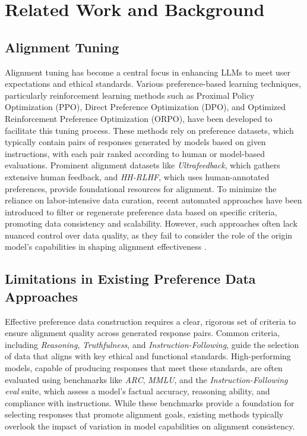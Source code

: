 \section{Related Work and Background}
\subsection{Alignment Tuning}
Alignment tuning has become a central focus in enhancing LLMs to meet user expectations and ethical standards\cite{sage_rt}. Various preference-based learning techniques, particularly reinforcement learning methods such as Proximal Policy Optimization (PPO)\cite{ppo}, Direct Preference Optimization (DPO)\cite{dpo}, and Optimized Reinforcement Preference Optimization (ORPO)\cite{orpo}, have been developed to facilitate this tuning process. These methods rely on preference datasets, which typically contain pairs of responses generated by models based on given instructions, with each pair ranked according to human or model-based evaluations. Prominent alignment datasets like \textit{Ultrafeedback\cite{ultrafeedback}}, which gathers extensive human feedback, and \textit{HH-RLHF\cite{hh_rlhf}}, which uses human-annotated preferences, provide foundational resources for alignment. To minimize the reliance on labor-intensive data curation, recent automated approaches have been introduced to filter or regenerate preference data based on specific criteria, promoting data consistency and scalability. However, such approaches often lack nuanced control over data quality, as they fail to consider the role of the origin model’s capabilities in shaping alignment effectiveness \cite{safer_instruct}.

\subsection{Limitations in Existing Preference Data Approaches}
Effective preference data construction requires a clear, rigorous set of criteria to ensure alignment quality across generated response pairs. Common criteria, including \textit{Reasoning}, \textit{Truthfulness}, and \textit{Instruction-Following}, guide the selection of data that aligns with key ethical and functional standards\cite{ultrafeedback, hh_rlhf}. High-performing models, capable of producing responses that meet these standards, are often evaluated using benchmarks like \textit{ARC\cite{arc}}, \textit{MMLU\cite{mmlu}}, and the \textit{Instruction-Following eval\cite{ifeval}} suite, which assess a model’s factual accuracy, reasoning ability, and compliance with instructions. While these benchmarks provide a foundation for selecting responses that promote alignment goals, existing methods typically overlook the impact of variation in model capabilities on alignment consistency. 

